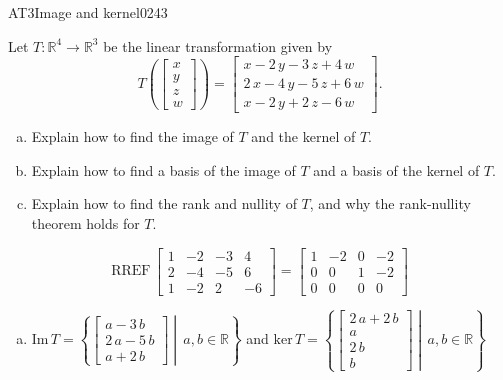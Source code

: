 \begin{exercise}{AT3}{Image and kernel}{0243} 
\begin{exerciseStatement} 

 Let \(T:\mathbb{R}^4 \to \mathbb{R}^3\) be the linear transformation given by \[T\left( \left[\begin{array}{c}
x \\
y \\
z \\
{w}
\end{array}\right] \right) = \left[\begin{array}{c}
x - 2 \, y - 3 \, z + 4 \, {w} \\
2 \, x - 4 \, y - 5 \, z + 6 \, {w} \\
x - 2 \, y + 2 \, z - 6 \, {w}
\end{array}\right].\] 

 

\begin{enumerate}[(a)]
\item Explain how to find the image of \(T\) and the kernel of \(T\).
\item Explain how to find a basis of the image of \(T\) and a basis of the kernel of \(T\).
\item Explain how to find the rank and nullity of \(T\), and why the rank-nullity theorem holds for \(T\).
\end{enumerate}

     \end{exerciseStatement}
 \begin{exerciseAnswer} 

\[\mathrm{RREF}\,\left[\begin{array}{cccc}
1 & -2 & -3 & 4 \\
2 & -4 & -5 & 6 \\
1 & -2 & 2 & -6
\end{array}\right]=\left[\begin{array}{cccc}
1 & -2 & 0 & -2 \\
0 & 0 & 1 & -2 \\
0 & 0 & 0 & 0
\end{array}\right]\]

 

\begin{enumerate}[(a)]
\item  

 \(\mathrm{Im}\,T =  \left\{ \left[\begin{array}{c}
a - 3 \, b \\
2 \, a - 5 \, b \\
a + 2 \, b
\end{array}\right] \middle|\,a,b\in\mathbb{R}\right\}\) and \(\mathrm{ker}\,T = \left\{ \left[\begin{array}{c}
2 \, a + 2 \, b \\
a \\
2 \, b \\
b
\end{array}\right] \middle|\,a,b\in\mathbb{R}\right\}\) 


\end{enumerate}
\end{exerciseAnswer}
\end{exercise}
